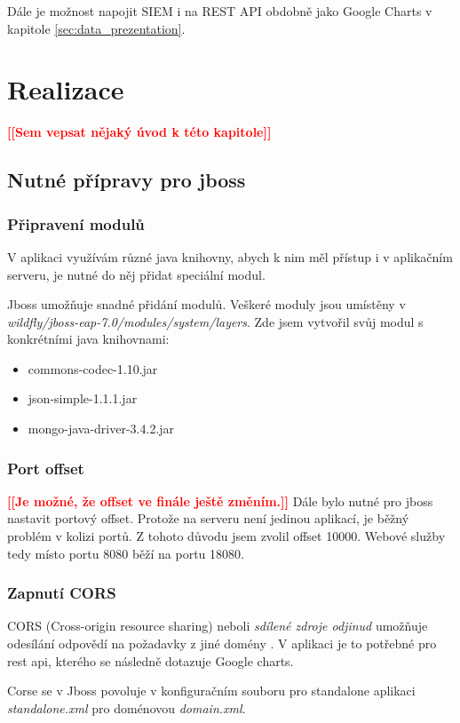\documentclass[thesis=M,czech]{FITthesis}[2012/10/20]
\newcommand{\todo}[1]{\textcolor{red}{\textbf{[[#1]]}}}
\begin{document}
		Dále je možnost napojit SIEM i na REST API obdobně jako Google Charts v kapitole \ref{sec:data_prezentation}.
		
\chapter{Realizace}
	\todo{Sem vepsat nějaký úvod k této kapitole}
	
	\section{Nutné přípravy pro jboss}
		\subsection{Připravení modulů}
		V aplikaci využívám různé java knihovny, abych k nim měl přístup i v aplikačním serveru, je nutné do něj přidat speciální modul.
		
		Jboss umožňuje snadné přidání modulů. Veškeré moduly jsou umístěny v \textit{wildfly/jboss-eap-7.0/modules/system/layers}. Zde jsem vytvořil svůj modul s konkrétními java knihovnami:
		\begin{itemize} 
			\item commons-codec-1.10.jar
			\item json-simple-1.1.1.jar
			\item mongo-java-driver-3.4.2.jar		
		\end{itemize}
		
		\subsection{Port offset}
		\todo{Je možné, že offset ve finále ještě změním.}
		Dále bylo nutné pro jboss nastavit portový offset. Protože na serveru není jedinou aplikací, je běžný problém v kolizi portů. Z tohoto důvodu jsem zvolil offset 10000. Webové služby tedy místo portu 8080 běží na portu 18080.
		
		\subsection{Zapnutí CORS}
		CORS (Cross-origin resource sharing) neboli \textit{sdílené zdroje odjinud} umožňuje odesílání odpovědí na požadavky z jiné domény \cite{CORS}. V aplikaci je to potřebné pro rest api, kterého se následně dotazuje Google charts.
		
		Corse se v Jboss povoluje v konfiguračním souboru pro standalone aplikaci \textit{standalone.xml} pro doménovou \textit{domain.xml}.
		
\end{document}
